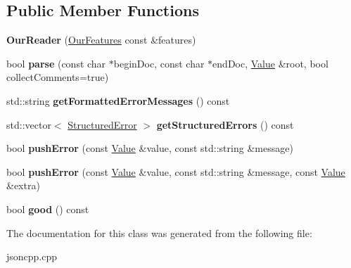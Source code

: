 \subsection*{Public Member Functions}
\begin{DoxyCompactItemize}
\item 
\hypertarget{class_json_1_1_our_reader_a48a850914b9c8d7781be172930c478e5}{{\bfseries Our\-Reader} (\hyperlink{class_json_1_1_our_features}{Our\-Features} const \&features)}\label{class_json_1_1_our_reader_a48a850914b9c8d7781be172930c478e5}

\item 
\hypertarget{class_json_1_1_our_reader_aba4f8749aab7f02ec17f107e392caf80}{bool {\bfseries parse} (const char $\ast$begin\-Doc, const char $\ast$end\-Doc, \hyperlink{class_json_1_1_value}{Value} \&root, bool collect\-Comments=true)}\label{class_json_1_1_our_reader_aba4f8749aab7f02ec17f107e392caf80}

\item 
\hypertarget{class_json_1_1_our_reader_ae9cbb7dbd9c6c96be37432e8dfa1afcb}{std\-::string {\bfseries get\-Formatted\-Error\-Messages} () const }\label{class_json_1_1_our_reader_ae9cbb7dbd9c6c96be37432e8dfa1afcb}

\item 
\hypertarget{class_json_1_1_our_reader_a02ef7871af3706754a233c36e6d489e9}{std\-::vector$<$ \hyperlink{struct_json_1_1_our_reader_1_1_structured_error}{Structured\-Error} $>$ {\bfseries get\-Structured\-Errors} () const }\label{class_json_1_1_our_reader_a02ef7871af3706754a233c36e6d489e9}

\item 
\hypertarget{class_json_1_1_our_reader_aef7aa4ca22ffaa38c401b16951d20e1e}{bool {\bfseries push\-Error} (const \hyperlink{class_json_1_1_value}{Value} \&value, const std\-::string \&message)}\label{class_json_1_1_our_reader_aef7aa4ca22ffaa38c401b16951d20e1e}

\item 
\hypertarget{class_json_1_1_our_reader_ad43315cbb0d6804e3b7177e84a1ec53d}{bool {\bfseries push\-Error} (const \hyperlink{class_json_1_1_value}{Value} \&value, const std\-::string \&message, const \hyperlink{class_json_1_1_value}{Value} \&extra)}\label{class_json_1_1_our_reader_ad43315cbb0d6804e3b7177e84a1ec53d}

\item 
\hypertarget{class_json_1_1_our_reader_a048346238d703ad9aed06beb686e6102}{bool {\bfseries good} () const }\label{class_json_1_1_our_reader_a048346238d703ad9aed06beb686e6102}

\end{DoxyCompactItemize}


The documentation for this class was generated from the following file\-:\begin{DoxyCompactItemize}
\item 
jsoncpp.\-cpp\end{DoxyCompactItemize}
